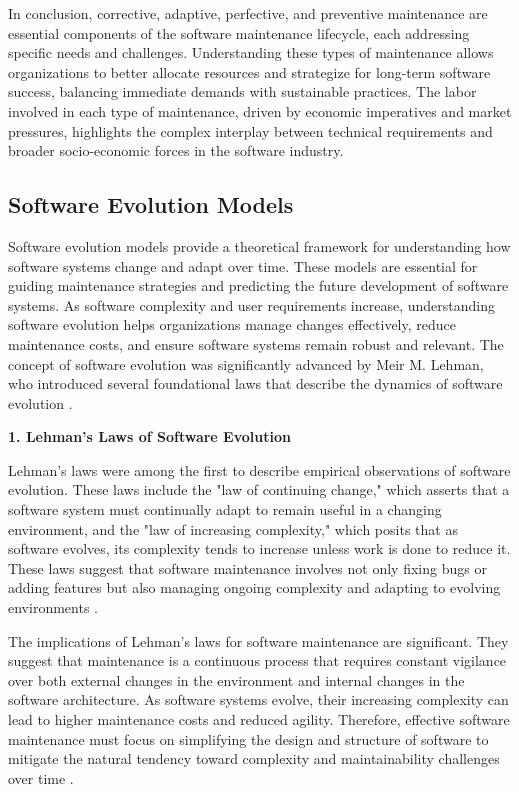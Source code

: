 \begin{refsection}
In conclusion, corrective, adaptive, perfective, and preventive maintenance are essential components of the software maintenance lifecycle, each addressing specific needs and challenges. Understanding these types of maintenance allows organizations to better allocate resources and strategize for long-term software success, balancing immediate demands with sustainable practices. The labor involved in each type of maintenance, driven by economic imperatives and market pressures, highlights the complex interplay between technical requirements and broader socio-economic forces in the software industry.

\subsection{Software Evolution Models}

Software evolution models provide a theoretical framework for understanding how software systems change and adapt over time. These models are essential for guiding maintenance strategies and predicting the future development of software systems. As software complexity and user requirements increase, understanding software evolution helps organizations manage changes effectively, reduce maintenance costs, and ensure software systems remain robust and relevant. The concept of software evolution was significantly advanced by Meir M. Lehman, who introduced several foundational laws that describe the dynamics of software evolution \cite[pp.~1061-1064]{lehman1980programs}.

\textbf{1. Lehman's Laws of Software Evolution}

Lehman's laws were among the first to describe empirical observations of software evolution. These laws include the "law of continuing change," which asserts that a software system must continually adapt to remain useful in a changing environment, and the "law of increasing complexity," which posits that as software evolves, its complexity tends to increase unless work is done to reduce it. These laws suggest that software maintenance involves not only fixing bugs or adding features but also managing ongoing complexity and adapting to evolving environments \cite[pp.~1062-1064]{lehman1980programs}.

The implications of Lehman's laws for software maintenance are significant. They suggest that maintenance is a continuous process that requires constant vigilance over both external changes in the environment and internal changes in the software architecture. As software systems evolve, their increasing complexity can lead to higher maintenance costs and reduced agility. Therefore, effective software maintenance must focus on simplifying the design and structure of software to mitigate the natural tendency toward complexity and maintainability challenges over time \cite[pp.~1064-1065]{lehman1980programs}.


\end{refsection}
